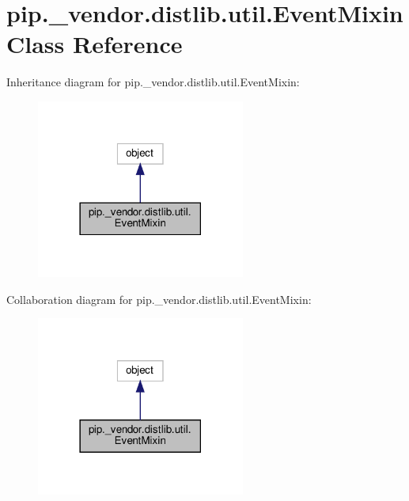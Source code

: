 \hypertarget{classpip_1_1__vendor_1_1distlib_1_1util_1_1EventMixin}{}\section{pip.\+\_\+vendor.\+distlib.\+util.\+Event\+Mixin Class Reference}
\label{classpip_1_1__vendor_1_1distlib_1_1util_1_1EventMixin}


Inheritance diagram for pip.\+\_\+vendor.\+distlib.\+util.\+Event\+Mixin\+:
\nopagebreak
\begin{figure}[H]
\begin{center}
\leavevmode
\includegraphics[width=194pt]{classpip_1_1__vendor_1_1distlib_1_1util_1_1EventMixin__inherit__graph}
\end{center}
\end{figure}


Collaboration diagram for pip.\+\_\+vendor.\+distlib.\+util.\+Event\+Mixin\+:
\nopagebreak
\begin{figure}[H]
\begin{center}
\leavevmode
\includegraphics[width=194pt]{classpip_1_1__vendor_1_1distlib_1_1util_1_1EventMixin__coll__graph}
\end{center}
\end{figure}
